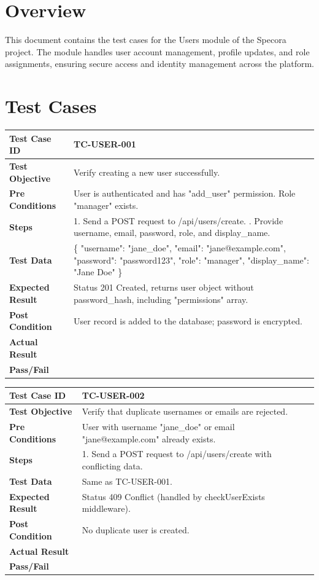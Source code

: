 \section{Overview}
This document contains the test cases for the Users module of the Specora project. The module handles user account management, profile updates, and role assignments, ensuring secure access and identity management across the platform.

\section{Test Cases}

\begin{longtable}{|p{}|p{}|}
\hline
\textbf{Test Case ID} & TC-USER-001 \\ \hline
\textbf{Test Objective} & Verify creating a new user successfully. \\ \hline
\textbf{Pre Conditions} & User is authenticated and has "add_user" permission. Role "manager" exists. \\ \hline
\textbf{Steps} & 
1. Send a POST request to /api/users/create. \newline
2. Provide username, email, password, role, and display\_name. \\ \hline
\textbf{Test Data} & \{ "username": "jane\_doe", "email": "jane@example.com", "password": "password123", "role": "manager", "display\_name": "Jane Doe" \} \\ \hline
\textbf{Expected Result} & Status 201 Created, returns user object without password\_hash, including "permissions" array. \\ \hline
\textbf{Post Condition} & User record is added to the database; password is encrypted. \\ \hline
\textbf{Actual Result} &  \\ \hline
\textbf{Pass/Fail} &  \\ \hline
\end{longtable}

\begin{longtable}{|p{}|p{}|}
\hline
\textbf{Test Case ID} & TC-USER-002 \\ \hline
\textbf{Test Objective} & Verify that duplicate usernames or emails are rejected. \\ \hline
\textbf{Pre Conditions} & User with username "jane\_doe" or email "jane@example.com" already exists. \\ \hline
\textbf{Steps} & 
1. Send a POST request to /api/users/create with conflicting data. \\ \hline
\textbf{Test Data} & Same as TC-USER-001. \\ \hline
\textbf{Expected Result} & Status 409 Conflict (handled by checkUserExists middleware). \\ \hline
\textbf{Post Condition} & No duplicate user is created. \\ \hline
\textbf{Actual Result} &  \\ \hline
\textbf{Pass/Fail} &  \\ \hline
\end{longtable}

